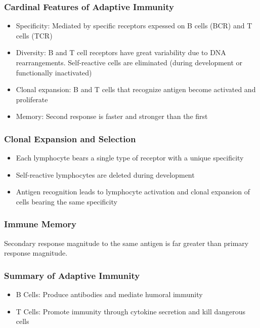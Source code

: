 \begin{itemize}
\begin{itemize}
\subsubsection{Cardinal Features of Adaptive Immunity}
\begin{itemize}
    \item Specificity: Mediated by specific receptors expessed on B cells (BCR) and T cells (TCR) 
    \item Diversity: B and T cell receptors have great variability due to DNA rearrangements. Self-reactive cells are eliminated (during development or functionally inactivated)
    \item Clonal expansion: B and T cells that recognize antigen become activated and proliferate
    \item Memory: Second response is faster and stronger than the first
    
\end{itemize}

\subsubsection{Clonal Expansion and Selection}
\begin{itemize}
    \item Each lymphocyte bears a single type of receptor with a unique specificity
    \item Self-reactive lymphocytes are deleted during development
    \item Antigen recognition leads to lymphocyte activation and clonal expansion of cells bearing the same specificity
\end{itemize}
\subsubsection{Immune Memory}
Secondary response magnitude to the same antigen is far greater than primary response magnitude.

\subsubsection{Summary of Adaptive Immunity}
\begin{itemize}
    \item B Cells: Produce antibodies and mediate humoral immunity
    \item T Cells: Promote immunity through cytokine secretion and kill dangerous cells
\end{itemize}



\end{itemize}
\end{itemize}
